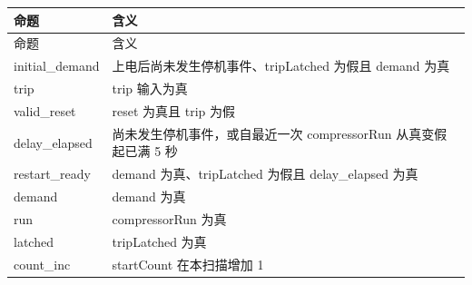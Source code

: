 \begin{longtable}{L{3.3cm}L{10.0cm}}

\toprule

命题 & 含义\\

\midrule

\endfirsthead

\toprule

命题 & 含义\\

\midrule

\endhead

{\ttfamily initial\_demand} & 上电后尚未发生停机事件、tripLatched 为假且 demand 为真\\

{\ttfamily trip} & trip 输入为真\\

{\ttfamily valid\_reset} & reset 为真且 trip 为假\\

{\ttfamily delay\_elapsed} & 尚未发生停机事件，或自最近一次 compressorRun 从真变假起已满 5 秒\\

{\ttfamily restart\_ready} & demand 为真、tripLatched 为假且 delay\_elapsed 为真\\

{\ttfamily demand} & demand 为真\\

{\ttfamily run} & compressorRun 为真\\

{\ttfamily latched} & tripLatched 为真\\

{\ttfamily count\_inc} & startCount 在本扫描增加 1\\

\bottomrule

\end{longtable}

